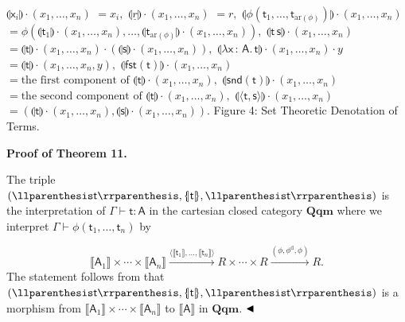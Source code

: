 \documentclass[10pt,a4paper]{amsart}
\begin{document}
    $\displaystyle\llparenthesis\mathsf{x}_{i}\rrparenthesis\cdot(x_{1},\ldots,x_{n})$ $\displaystyle=x_{i},$     $\displaystyle\llparenthesis\underline{r}\rrparenthesis\cdot(x_{1},\ldots,x_{n})$ $\displaystyle=r,$     $\displaystyle\llparenthesis\phi(\mathsf{t}_{1},\ldots,\mathsf{t}_{\mathrm{ar}(%
\phi)})\rrparenthesis\cdot(x_{1},\ldots,x_{n})$ $\displaystyle=\phi(\llparenthesis\mathsf{t}_{1}\rrparenthesis\cdot(x_{1},%
\ldots,x_{n}),\ldots,\llparenthesis\mathsf{t}_{\mathrm{ar}(\phi)}%
\rrparenthesis\cdot(x_{1},\ldots,x_{n})),$     $\displaystyle\llparenthesis\mathsf{t}\,\mathsf{s}\rrparenthesis\cdot(x_{1},%
\ldots,x_{n})$ $\displaystyle=\llparenthesis\mathsf{t}\rrparenthesis\cdot(x_{1},\ldots,x_{n})%
\cdot(\llparenthesis\mathsf{s}\rrparenthesis\cdot(x_{1},\ldots,x_{n})),$     $\displaystyle\llparenthesis\lambda\mathsf{x}\,{:}\,\mathsf{A}.\,\mathsf{t}%
\rrparenthesis\cdot(x_{1},\ldots,x_{n})\cdot y$ $\displaystyle=\llparenthesis\mathsf{t}\rrparenthesis\cdot(x_{1},\ldots,x_{n},y),$     $\displaystyle\llparenthesis\mathsf{fst}(\mathsf{t})\rrparenthesis\cdot(x_{1},%
\ldots,x_{n})$ $\displaystyle=\text{the first component of }\llparenthesis\mathsf{t}%
\rrparenthesis\cdot(x_{1},\ldots,x_{n}),$     $\displaystyle\llparenthesis\mathsf{snd}(\mathsf{t})\rrparenthesis\cdot(x_{1},%
\ldots,x_{n})$ $\displaystyle=\text{the second component of }\llparenthesis\mathsf{t}%
\rrparenthesis\cdot(x_{1},\ldots,x_{n}),$     $\displaystyle\llparenthesis\langle\mathsf{t},\mathsf{s}\rangle\rrparenthesis%
\cdot(x_{1},\ldots,x_{n})$ $\displaystyle=(\llparenthesis\mathsf{t}\rrparenthesis\cdot(x_{1},\ldots,x_{n})%
,\llparenthesis\mathsf{s}\rrparenthesis\cdot(x_{1},\ldots,x_{n})).$    
Figure 4: Set Theoretic Denotation of Terms.\par
 
 
 
\par\medskip\noindent\textbf{Proof of Theorem 11.}\par
 
 
The triple $(\llparenthesis\mathsf{t}\rrparenthesis,\{\hskip-2.25pt|\mathsf{t}|\hskip-2.25%
pt\},\llparenthesis\mathsf{t}\rrparenthesis)$ is the interpretation of $\mathsf{\Gamma}\vdash\mathsf{t}:\mathsf{A}$ in the cartesian closed category $\mathbf{Qqm}$ where we interpret $\mathsf{\Gamma}\vdash\phi(\mathsf{t}_{1},\ldots,\mathsf{t}_{n})$ by\par
    \[\llbracket\mathsf{A}_{1}\rrbracket\times\cdots\times\llbracket\mathsf{A}_{n}%
\rrbracket\xrightarrow{\langle\llbracket\mathsf{t}_{1}\rrbracket,\ldots,%
\llbracket\mathsf{t}_{n}\rrbracket\rangle}R\times\cdots\times R\xrightarrow{(%
\phi,\phi^{\mathrm{d}},\phi)}R.\]    
The statement follows from that $(\llparenthesis\mathsf{t}\rrparenthesis,\{\hskip-2.25pt|\mathsf{t}|\hskip-2.25%
pt\},\llparenthesis\mathsf{t}\rrparenthesis)$ is a morphism from $\llbracket\mathsf{A}_{1}\rrbracket\times\cdots\times\llbracket\mathsf{A}_{n}\rrbracket$ to $\llbracket\mathsf{A}\rrbracket$ in $\mathbf{Qqm}$. $\hfill\blacktriangleleft$\par
 
\end{document}
